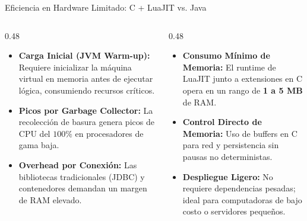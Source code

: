 \documentclass[10pt,aspectratio=169]{beamer}
\begin{document}
\begin{frame}{Eficiencia en Hardware Limitado: C + LuaJIT vs. Java}
    \begin{columns}[T]
        \begin{column}{0.48\textwidth}
            \begin{itemize}
                \item \textbf{Carga Inicial (JVM Warm-up):} Requiere inicializar la máquina virtual en memoria antes de ejecutar lógica, consumiendo recursos críticos.
                \item \textbf{Picos por Garbage Collector:} La recolección de basura genera picos de CPU del $100\%$ en procesadores de gama baja.
                \item \textbf{Overhead por Conexión:} Las bibliotecas tradicionales (JDBC) y contenedores demandan un margen de RAM elevado.
            \end{itemize}
        \end{column}

        \begin{column}{0.48\textwidth}
            \begin{itemize}
                \item \textbf{Consumo Mínimo de Memoria:} El runtime de LuaJIT junto a extensiones en C opera en un rango de \textbf{1 a 5 MB} de RAM.
                \item \textbf{Control Directo de Memoria:} Uso de buffers en C para red y persistencia sin pausas no deterministas.
                \item \textbf{Despliegue Ligero:} No requiere dependencias pesadas; ideal para computadoras de bajo costo o servidores pequeños.
            \end{itemize}
        \end{column}
    \end{columns}

    \vspace{0.3cm}
\end{frame}

\newpage
\end{document}
